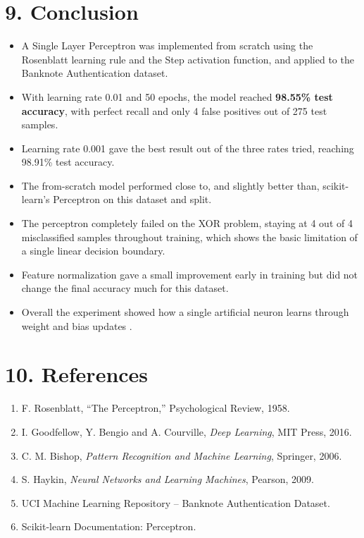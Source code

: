 \documentclass[11pt]{article}
\begin{document}
\section*{9. Conclusion}
\begin{itemize}
\item A Single Layer Perceptron was implemented from scratch using the Rosenblatt learning rule
and the Step activation function, and applied to the Banknote Authentication dataset.
\item With learning rate 0.01 and 50 epochs, the model reached \textbf{98.55\% test accuracy},
with perfect recall and only 4 false positives out of 275 test samples.
\item Learning rate 0.001 gave the best result out of the three rates tried, reaching 98.91\% test
accuracy.
\item The from-scratch model performed close to, and slightly better than, scikit-learn's
Perceptron on this dataset and split.
\item The perceptron completely failed on the XOR problem, staying at 4 out of 4 misclassified
samples throughout training, which shows the basic limitation of a single linear decision boundary.
\item Feature normalization gave a small improvement early in training but did not change the
final accuracy much for this dataset.
\item Overall the experiment showed how a single artificial neuron learns through weight and bias
updates .
\end{itemize}

\section*{10. References}
\begin{enumerate}
\item F. Rosenblatt, ``The Perceptron,'' Psychological Review, 1958.
\item I. Goodfellow, Y. Bengio and A. Courville, \emph{Deep Learning}, MIT Press, 2016.
\item C. M. Bishop, \emph{Pattern Recognition and Machine Learning}, Springer, 2006.
\item S. Haykin, \emph{Neural Networks and Learning Machines}, Pearson, 2009.
\item UCI Machine Learning Repository -- Banknote Authentication Dataset.
\item Scikit-learn Documentation: Perceptron.
\end{enumerate}
\end{document}
